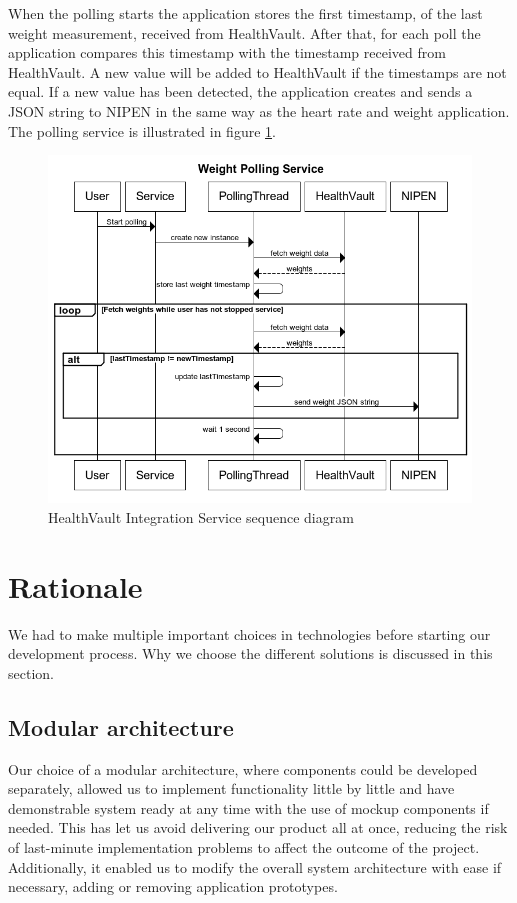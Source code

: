 When the polling starts the application stores the first timestamp, of the last weight measurement, received from HealthVault.
After that, for each poll the application compares this timestamp with the timestamp received from HealthVault.
A new value will be added to HealthVault if the timestamps are not equal.
If a new value has been detected, the application creates and sends a JSON string to NIPEN in the same way as the heart rate and weight application.
The polling service is illustrated in figure \ref{figure:weight-polling-service}.

\begin{figure}[h]
\centering
\includegraphics[scale=0.8]{../Figures/weight-polling-service.png}
\caption{HealthVault Integration Service sequence diagram}
\label{figure:weight-polling-service}
\end{figure}

\section{Rationale}

We had to make multiple important choices in technologies before starting our development process.
Why we choose the different solutions is discussed in this section.

\subsection{Modular architecture}
Our choice of a modular architecture, where components could be developed separately,
allowed us to implement functionality little by little and have demonstrable
system ready at any time with the use of mockup components if needed.
This has let us avoid delivering our product all at once, reducing the risk
of last-minute implementation problems to affect the outcome of the project.
Additionally, it enabled us to modify the overall system architecture with ease
if necessary, adding or removing application prototypes.

